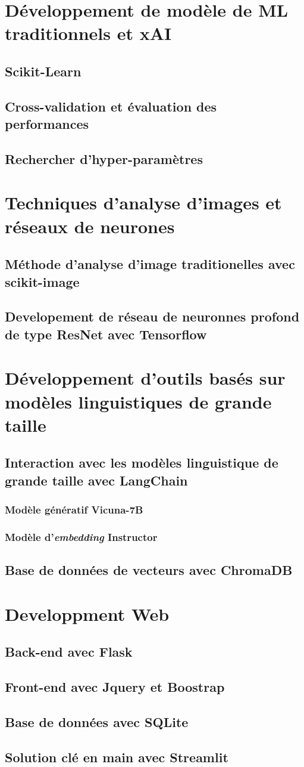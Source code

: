 \section{Développement de modèle de ML traditionnels et xAI}
\subsection{Scikit-Learn}
\subsection{Cross-validation et évaluation des performances}
\subsection{Rechercher d'hyper-paramètres}
\section{Techniques d'analyse d'images et réseaux de neurones}
\subsection{Méthode d'analyse d'image traditionelles avec scikit-image}
\subsection{Developement de réseau de neuronnes profond de type ResNet avec Tensorflow}
\section{Développement d'outils basés sur modèles linguistiques de grande taille}
\subsection{Interaction avec les modèles linguistique de grande taille avec LangChain}
\subsubsection{Modèle génératif Vicuna-7B}
\subsubsection{Modèle d'\textit{embedding} Instructor}
\subsection{Base de données de vecteurs avec ChromaDB}
\section{Developpment Web}
\subsection{Back-end avec Flask}
\subsection{Front-end avec Jquery et Boostrap}
\subsection{Base de données avec SQLite}
\subsection{Solution clé en main avec Streamlit}
